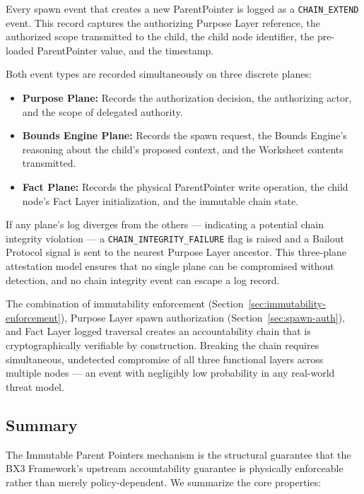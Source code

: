 Every spawn event that creates a new ParentPointer is logged as a \texttt{CHAIN\_EXTEND} event. This record captures the authorizing Purpose Layer reference, the authorized scope transmitted to the child, the child node identifier, the pre-loaded ParentPointer value, and the timestamp.

Both event types are recorded simultaneously on three discrete planes:

\begin{itemize}[noitemsep]
    \item \textbf{Purpose Plane:} Records the authorization decision, the authorizing actor, and the scope of delegated authority.
    \item \textbf{Bounds Engine Plane:} Records the spawn request, the Bounds Engine's reasoning about the child's proposed context, and the Worksheet contents transmitted.
    \item \textbf{Fact Plane:} Records the physical ParentPointer write operation, the child node's Fact Layer initialization, and the immutable chain state.
\end{itemize}

If any plane's log diverges from the others --- indicating a potential chain integrity violation --- a \texttt{CHAIN\_INTEGRITY\_FAILURE} flag is raised and a Bailout Protocol signal is sent to the nearest Purpose Layer ancestor. This three-plane attestation model ensures that no single plane can be compromised without detection, and no chain integrity event can escape a log record.

The combination of immutability enforcement (Section~\ref{sec:immutability-enforcement}), Purpose Layer spawn authorization (Section~\ref{sec:spawn-auth}), and Fact Layer logged traversal creates an accountability chain that is cryptographically verifiable by construction. Breaking the chain requires simultaneous, undetected compromise of all three functional layers across multiple nodes --- an event with negligibly low probability in any real-world threat model.

\subsection{Summary}

The Immutable Parent Pointers mechanism is the structural guarantee that the BX3 Framework's upstream accountability guarantee is physically enforceable rather than merely policy-dependent. We summarize the core properties:

